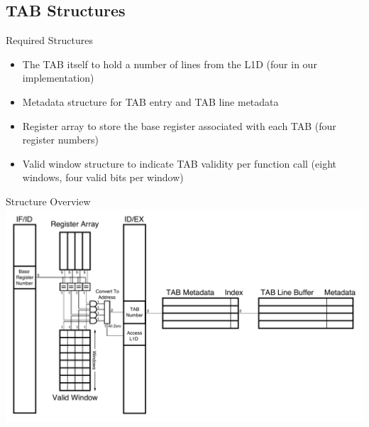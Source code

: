 \documentclass{beamer}
\begin{document}
\subsection{TAB Structures}
\begin{frame}{Required Structures}
   \begin{itemize}
      \item The TAB itself to hold a number of lines from the L1D 
         (four in our implementation)
      \item Metadata structure for TAB entry and TAB line metadata
      \item Register array to store the base register associated with
         each TAB (four register numbers)
      \item Valid window structure to indicate TAB validity per function call
         (eight windows, four valid bits per window)
   \end{itemize}
\end{frame}
\begin{frame}{Structure Overview}
   \includegraphics[width=\textwidth]{figures/tabhardware.pdf}
\end{frame}
\end{document}
